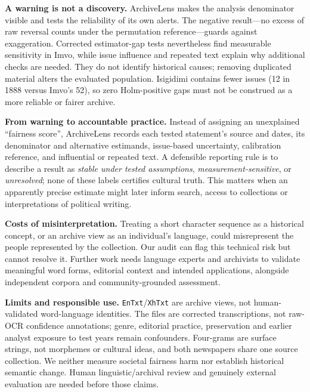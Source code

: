 \documentclass[10pt,letterpaper]{article}
\begin{document}
\textbf{A warning is not a discovery.} ArchiveLens makes the analysis denominator visible and tests the reliability of its own alerts. The negative result---no excess of raw reversal counts under the permutation reference---guards against exaggeration. Corrected estimator-gap tests nevertheless find measurable sensitivity in Imvo, while issue influence and repeated text explain why additional checks are needed. They do not identify historical causes; removing duplicated material alters the evaluated population. Isigidimi contains fewer issues (12 in 1888 versus Imvo's 52), so zero Holm-positive gaps must not be construed as a more reliable or fairer archive.

\textbf{From warning to accountable practice.} Instead of assigning an unexplained ``fairness score'', ArchiveLens records each tested statement's source and dates, its denominator and alternative estimands, issue-based uncertainty, calibration reference, and influential or repeated text. A defensible reporting rule is to describe a result as \emph{stable under tested assumptions}, \emph{measurement-sensitive}, or \emph{unresolved}; none of these labels certifies cultural truth. This matters when an apparently precise estimate might later inform search, access to collections or interpretations of political writing.\par

\textbf{Costs of misinterpretation.} Treating a short character sequence as a historical concept, or an archive view as an individual's language, could misrepresent the people represented by the collection. Our audit can flag this technical risk but cannot resolve it. Further work needs language experts and archivists to validate meaningful word forms, editorial context and intended applications, alongside independent corpora and community-grounded assessment.\par

\textbf{Limits and responsible use.} \texttt{EnTxt}/\texttt{XhTxt} are archive views, not human-validated word-language identities. The files are corrected transcriptions, not raw-OCR confidence annotations; genre, editorial practice, preservation and earlier analyst exposure to test years remain confounders. Four-grams are surface strings, not morphemes or cultural ideas, and both newspapers share one source collection. We neither measure societal fairness harm nor establish historical semantic change. Human linguistic/archival review and genuinely external evaluation are needed before those claims.
\end{document}
